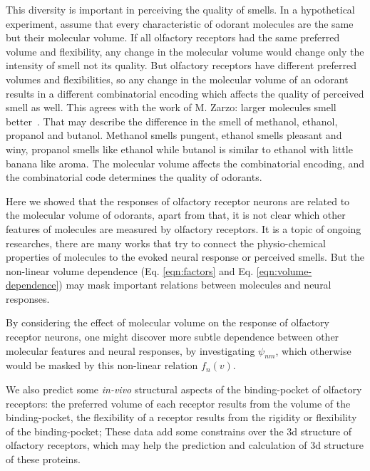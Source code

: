 \documentclass[11pt]{article} %
\begin{document}
This diversity is important in perceiving the quality of smells. 
In a hypothetical experiment, 
assume that every characteristic of odorant molecules are the same but their molecular volume.
If all olfactory receptors had the same preferred volume and flexibility, 
any change in the molecular volume would change only the intensity of smell not its quality.
But olfactory receptors have different preferred volumes and flexibilities, 
so any change in the molecular volume of an odorant results in a different combinatorial encoding which affects the quality of perceived smell as well. 
This agrees with the work of M. Zarzo: larger molecules  smell better~\cite{}.
That may describe the difference in the smell of methanol, ethanol, propanol and butanol. 
Methanol smells pungent, ethanol smells pleasant and winy, propanol smells like ethanol while butanol is similar to ethanol with little banana like aroma.
The molecular volume affects the combinatorial encoding, 
and the combinatorial code determines the quality of odorants.

Here we showed that the responses of olfactory receptor neurons are related to the molecular volume of odorants, 
apart from that, it is not clear which other features of molecules are measured by olfactory receptors. 
It is a topic of ongoing researches, 
there are many works that try to connect the physio-chemical properties of molecules to the evoked neural response or perceived smells.
But the non-linear volume dependence (Eq. \ref{eqn:factors} and Eq. \ref{eqn:volume-dependence})  
may mask important relations between molecules and neural responses.

By considering the effect of molecular volume on the response of olfactory receptor neurons, 
one might discover more subtle dependence between other molecular features and neural responses, 
by investigating $\psi_{nm}$, 
which otherwise would be masked by this non-linear relation $f_n(v)$.

We also predict some {\it in-vivo} structural aspects of  the binding-pocket of olfactory receptors:
the preferred volume of each receptor results from the volume of the binding-pocket,
the flexibility of a receptor results from the rigidity or flexibility of the binding-pocket; 
These data add some constrains over the 3d structure of olfactory receptors, 
which may help the prediction and calculation of 3d structure of these proteins. 
\end{document}
